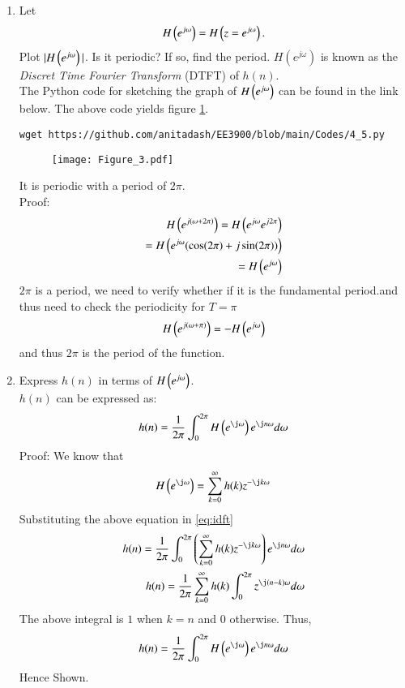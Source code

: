 \documentclass[journal,12pt,twocolumn]{IEEEtran}
\renewcommand\thesection{\arabic{section}}
\begin{document}
\begin{enumerate}[label=\thesection.\arabic*
,ref=\thesection.\theenumi]
\item
Let
\begin{equation}
H\left(e^{j \omega}\right) = H\left(z = e^{j \omega}\right).
\end{equation}
Plot $|H\left(e^{j \omega}\right)|$.  Is it periodic? If so, find the period. $H(e^{j \omega})$ is
known as the {\em Discret Time Fourier Transform} (DTFT) of $h(n)$.
\\
\solution The Python code for sketching the graph of $H\left(e^{j\omega}\right)$ can be found in the link below. The above code yields figure \ref{fig:3}.
\begin{lstlisting}
wget https://github.com/anitadash/EE3900/blob/main/Codes/4_5.py
\end{lstlisting}                
\begin{figure}[!ht]
\begin{center}
\texttt{[image: Figure\_3.pdf]}
\end{center}
\label{fig:3}	
\end{figure}
It is periodic with a period of $2\pi$.\\
Proof:
\begin{align}
H\left(e^{j (\omega+2\pi)}\right) = H\left(e^{j \omega}e^{j2\pi}\right)\\
=H\left(e^{j \omega}(\cos(2\pi)+j\sin(2\pi))\right)\\
=H\left(e^{j \omega}\right)
\end{align}
$2\pi$ is a period, we need to verify whether if it is the fundamental period.and thus need to check the periodicity for $T=\pi$\\
\begin{align}
H\left(e^{j (\omega+\pi)}\right)=-H\left(e^{j \omega}\right)       
\end{align}
and thus $2\pi$ is the period of the function.
\item Express $h(n)$ in terms of $H\left(e^{j \omega}\right)$.
\\
\solution $h(n)$ can be expressed as:
\begin{equation}
\label{eq:idft}
h(n) = \frac{1}{2\pi} \int_{0}^{2\pi} H\brak{e^{\j \omega}}e^{\j n \omega}d \omega
\end{equation}
Proof: We know that\\
\begin{equation}
H\brak{e^{\j \omega}} = \sum _{k=0}^{\infty }h(k)z^{-\j k \omega}
\end{equation}
Substituting the above equation in \eqref{eq:idft}
\begin{align}
h(n) = \frac{1}{2\pi}\int_{0}^{2\pi}\brak{ \sum _{k=0}^{\infty }h(k)z^{-\j k \omega}}e^{\j n \omega}d \omega\\
h(n) = \frac{1}{2\pi}\sum _{k=0}^{\infty }h(k)\int_{0}^{2\pi}z^{\j(n-k) \omega}d \omega
\end{align}
The above integral is $1$ when $k=n$ and $0$ otherwise. Thus,
\begin{equation}
h(n) = \frac{1}{2\pi}\int_{0}^{2\pi} H\brak{e^{\j \omega}}e^{\j n \omega}d \omega
\end{equation}
Hence Shown.
\end{enumerate}
\end{document}
